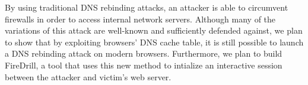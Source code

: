 By using traditional DNS rebinding attacks, an attacker is able to circumvent firewalls in order to access internal network servers. Although many of the variations of this attack are well-known and sufficiently defended against, we plan to show that by exploiting browsers' DNS cache table, it is still possible to launch a DNS rebinding attack on modern browsers. Furthermore, we plan to build FireDrill, a tool that uses this new method to intialize an interactive session between the attacker and victim's web server.
